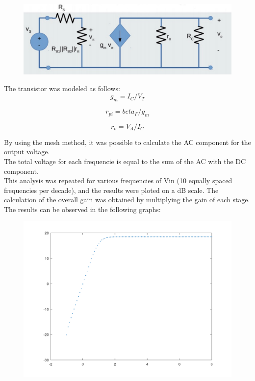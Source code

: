 \FloatBarrier
\begin{figure}
  \includegraphics{incremental_model.pdf}
  \caption{}
  \label{}
\end{figure}
\FloatBarrier 

The transistor was modeled as follows:\\

\begin{equation}
 g_{m} = I_{C}/V_{T}
 \label{}
\end{equation} 

\begin{equation}
 r_{pi}= {beta}_{F}/g_{m}
   \label{}
\end{equation} 

\begin{equation}
  r_{o}= V_{A}/I_{C}
  \label{}
\end{equation} 

By using the mesh method, it was possible to calculate the AC component for the output voltage.\\
The total voltage for each frequencie is equal to the sum of the AC with the DC component.\\

This analysis was repeated for various frequencies of Vin (10 equally spaced frequencies per decade), and the results were ploted on a dB scale.
The calculation of the overall gain was obtained by multiplying the gain of each stage. The results can be observed in the following graphs:\\ 

\FloatBarrier
\begin{figure}
  \includegraphics{GAIN_Exprimental_R3_a_0.png}
  \caption{}
  \label{}
\end{figure}
\FloatBarrier 

